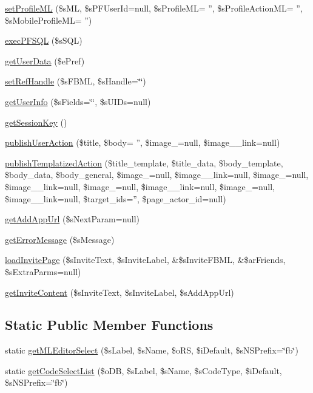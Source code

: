 \begin{DoxyCompactItemize}
\item 
\hyperlink{classSF__Platform_a24c354534c9265c4a7cbd73c0f82ba56}{setProfileML} (\$sML, \$sPFUserId=null, \$sProfileML= '', \$sProfileActionML= '', \$sMobileProfileML= '')
\item 
\hyperlink{classSF__Platform_aea9e29722f6d4ecdfab07f196e132bcb}{execPFSQL} (\$sSQL)
\item 
\hyperlink{classSF__Platform_af25bc3b138038094b8a0b8233adf06c7}{getUserData} (\$ePref)
\item 
\hyperlink{classSF__Platform_aa70ade6295aedd084a68f97b27441c3b}{setRefHandle} (\$sFBML, \$sHandle=\char`\"{}\char`\"{})
\item 
\hyperlink{classSF__Platform_aad5709bf4b030e39bc8e7e2cbf4812a5}{getUserInfo} (\$sFields=\char`\"{}\char`\"{}, \$sUIDs=null)
\item 
\hyperlink{classSF__Platform_a71b7a74bd23b2c2be77aad5448cda40b}{getSessionKey} ()
\item 
\hyperlink{classSF__Platform_a1b675b86fea379a2fffe42a929336863}{publishUserAction} (\$title, \$body= '', \$image\_=null, \$image\_\_\-link=null)
\item 
\hyperlink{classSF__Platform_a2934d82c09cab3e5d4a9a48d8c20e9e0}{publishTemplatizedAction} (\$title\_\-template, \$title\_\-data, \$body\_\-template, \$body\_\-data, \$body\_\-general, \$image\_=null, \$image\_\_\-link=null, \$image\_=null, \$image\_\_\-link=null, \$image\_=null, \$image\_\_\-link=null, \$image\_=null, \$image\_\_\-link=null, \$target\_\-ids='', \$page\_\-actor\_\-id=null)
\item 
\hyperlink{classSF__Platform_a9ffd051e90f4f71d5930fe4d3123eb85}{getAddAppUrl} (\$sNextParam=null)
\item 
\hyperlink{classSF__Platform_abeaeaede3b8397506c43ad11e30a9ad2}{getErrorMessage} (\$sMessage)
\item 
\hyperlink{classSF__Platform_a4b06a12e4e229a553f98c93c2dad9c9e}{loadInvitePage} (\$sInviteText, \$sInviteLabel, \&\$sInviteFBML, \&\$arFriends, \$sExtraParms=null)
\item 
\hyperlink{classSF__Platform_ae9be876b94d769590d9a4c90d330ad55}{getInviteContent} (\$sInviteText, \$sInviteLabel, \$sAddAppUrl)
\end{DoxyCompactItemize}
\subsection*{Static Public Member Functions}
\begin{DoxyCompactItemize}
\item 
static \hyperlink{classSF__Platform_a62453ddee0ad73bf75416e79302d41fd}{getMLEditorSelect} (\$sLabel, \$sName, \$oRS, \$iDefault, \$sNSPrefix=\char`\"{}fb\char`\"{})
\item 
static \hyperlink{classSF__Platform_a288c92b5b26beeb718572201a65288d9}{getCodeSelectList} (\$oDB, \$sLabel, \$sName, \$sCodeType, \$iDefault, \$sNSPrefix=\char`\"{}fb\char`\"{})
\end{DoxyCompactItemize}
